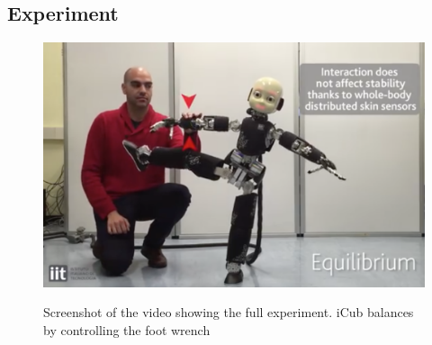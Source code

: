 \documentclass[final,5p,twocolumn]{elsarticle}
\DeclareMathOperator*{\argmin}{argmin}
\begin{document}
%
%

\subsection{Experiment}

\begin{figure}
\centering
\includegraphics[width=0.9\columnwidth]{images/icubPicture} \\
\caption{Screenshot of the video showing the full experiment. iCub balances by controlling the foot wrench
} \label{fig:snapshot}
\end{figure}
\end{document}
